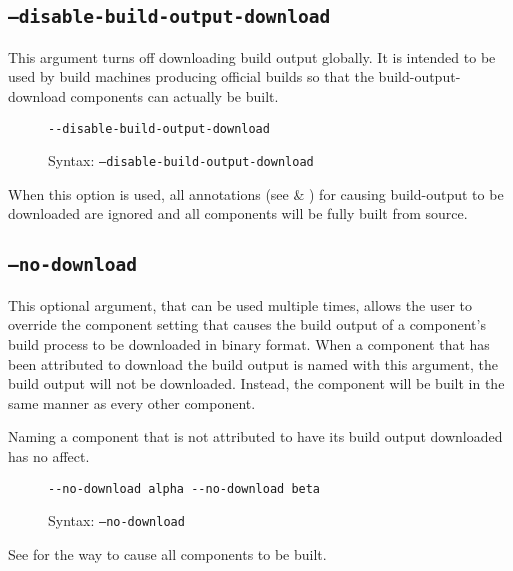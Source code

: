\subsection{\texttt{--disable-build-output-download}}
\label{usinglmsbw:disable-build-output-download}

This argument turns off downloading build output globally.  It is
intended to be used by build machines producing official builds so
that the build-output-download components can actually be built.

\begin{figure}[h]
  \hrulefill
\begin{verbatim}
--disable-build-output-download
\end{verbatim}
  \caption{Syntax: \texttt{--disable-build-output-download}}
  \hrulefill
\end{figure}

When this option is used, all annotations (see
 \&
) for causing build-output to be
downloaded are ignored and all components will be fully built from
source.

\subsection{\texttt{--no-download}}\label{usinglmsbw:no-download}

This optional argument, that can be used multiple times, allows the
user to override the component setting that causes the build output of
a component's build process to be downloaded in binary format.  When a
component that has been attributed to download the build output is
named with this argument, the build output will not be downloaded.
Instead, the component will be built in the same manner as every other
component.

Naming a component that is not attributed to have its build output
downloaded has no affect.

\begin{figure}[h]
  \hrulefill
\begin{verbatim}
--no-download alpha --no-download beta
\end{verbatim}
  \caption{Syntax: \texttt{--no-download}}
  \hrulefill
\end{figure}

See  for the way to
cause all components to be built.

